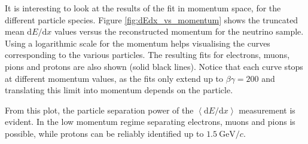 It is interesting to look at the results of the fit in momentum space, for the different particle species. Figure \ref{fig:dEdx_vs_momentum} shows the truncated mean $\mathrm{d}E/\mathrm{d}x$ values versus the reconstructed momentum for the neutrino sample. Using a logarithmic scale for the momentum helps visualising the curves corresponding to the various particles. The resulting fits for electrons, muons, pions and protons are also shown (solid black lines). Notice that each curve stops at different momentum values, as the fits only extend up to $\beta\gamma = 200$ and translating this limit into momentum depends on the particle.

From this plot, the particle separation power of the $\left<\mathrm{d}E/\mathrm{d}x\right>$ measurement is evident. In the low momentum regime separating electrons, muons and pions is possible, while protons can be reliably identified up to $1.5~\mathrm{GeV}/c$.

